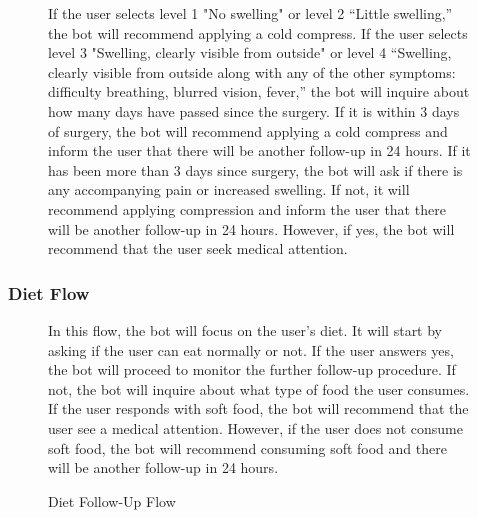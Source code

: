 \documentclass[12pt,oneside,openright,a4paper]{cpe-english-project}
\begin{document}
\begin{figure}[H]
\begin{justify}
              \qquad If the user selects level 1 "No swelling" or level 2 “Little swelling,” the bot will recommend applying a cold compress. If the user selects level 3 "Swelling, clearly visible from outside" or level 4 “Swelling, clearly visible from outside along with any of the other symptoms: difficulty breathing, blurred vision, fever,” the bot will inquire about how many days have passed since the surgery. If it is within 3 days of surgery, the bot will recommend applying a cold compress and inform the user that there will be another follow-up in 24 hours. If it has been more than 3 days since surgery, the bot will ask if there is any accompanying pain or increased swelling. If not, it will recommend applying compression and inform the user that there will be another follow-up in 24 hours. However, if yes, the bot will recommend that the user seek medical attention.\par
            \end{justify}        
          \end{figure}
        \subsubsection{Diet  Flow}
          \begin{figure}[H]
            \centering
            \caption{Diet Follow-Up Flow}\label{fig:FollowUpFlow5}
            \begin{justify}
              \qquad In this flow, the bot will focus on the user's diet. It will start by asking if the user can eat normally or not. If the user answers yes, the bot will proceed to monitor the further follow-up procedure. If not, the bot will inquire about what type of food the user consumes. If the user responds with soft food, the bot will recommend that the user see a medical attention. However, if the user does not consume soft food, the bot will recommend consuming soft food and there will be another follow-up in 24 hours.\par
            \end{justify}        
          \end{figure}
\end{document}
